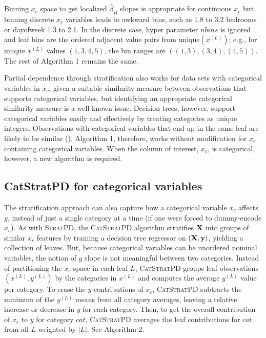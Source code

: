 \documentclass[12pt]{article}
\newcommand{\spd}{\fontfamily{cmr}\textsc{\small StratPD}}
\newcommand{\cspd}{\fontfamily{cmr}\textsc{\small CatStratPD}}
\newcommand{\xnc}{$x_{\overline{c}}$}
\begin{document}
Binning $x_c$ space to get localized $\hat{\beta}_B$ slopes is appropriate for continuous $x_c$ but binning discrete $x_c$ variables leads to awkward bins, such as 1.8 to 3.2 bedrooms or dayofweek 1.3 to 2.1. In the discrete case, hyper parameter $nbins$ is ignored and leaf bins are the ordered adjacent value pairs from unique$(x^{(L)})$; e.g., for unique $x^{(L)}$ values $(1,3,4,5)$, the bin ranges are $((1,3), (3,4), (4,5))$. The rest of Algorithm 1 remains the same.

Partial dependence through stratification also works for data sets with categorical variables in \xnc{}, given a suitable similarity measure between observations that supports categorical variables, but identifying an appropriate categorical similarity measure is a well-known issue.  Decision trees, however, support categorical variables easily and effectively by treating categories as unique integers. Observations with categorical variables that end up in the same leaf are likely to be similar (\cite{RFunsup}). Algorithm 1, therefore, works without modification for \xnc{} containing categorical variables. When the column of interest, $x_c$, is categorical, however, a new algorithm is required.

\subsection{CatStratPD for categorical variables}

The stratification approach can also capture how a categorical variable $x_c$ affects $y$, instead of just a single category at a time (if one were forced to dummy-encode $x_c$). As with \spd{}, the \cspd{} algorithm stratifies $\bf X$ into groups of similar \xnc{} features by training a decision tree regressor on $({\bf X}, {\bf y})$, yielding a collection of leaves. But, because categorical variables can be unordered nominal variables, the notion of $y$ slope is not meaningful between two categories. Instead of partitioning the $x_c$ space in each leaf $L$, \cspd{} groups leaf observations $(x^{(L)}, y^{(L)})$ by the categories in $x^{(L)}$ and computes the average $y^{(L)}$ value per category.  To erase the $y$-contributions of \xnc{}, \cspd{} subtracts the minimum of the $y^{(L)}$ means from all category averages, leaving a relative increase or decrease in $y$  for each category. Then, to get the overall contribution of $x_c$ to $y$ for category $cat$, \cspd{} averages the leaf contributions for $cat$ from all $L$ weighted by $|L|$. See Algorithm 2.
\end{document}
